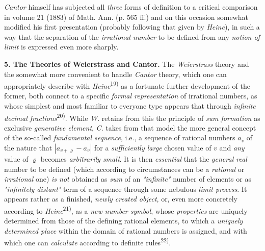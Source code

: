 \thispagestyle{fancy}

\vspace{0.5cm}

\textit{Cantor} himself has subjected all \textit{three} forms of definition to a critical comparison in volume 21 (1883) of Math. Ann. (p. 565 ff.) and on this occasion somewhat modified his first presentation (probably following that given by \textit{Heine}), in such a way that the separation of the \textit{irrational number} to be defined from any \textit{notion of limit} is expressed even more sharply.

\vspace{0.3cm}

\textbf{5. The Theories of Weierstrass and Cantor.} The \textit{Weierstrass} theory and the somewhat more convenient to handle \textit{Cantor} theory, which one can appropriately describe with \textit{Heine}\textsuperscript{19)} as a fortunate further development of the former, both connect to a specific \textit{formal representation} of irrational numbers, as whose simplest and most familiar to everyone type appears that through \textit{infinite decimal fractions}\textsuperscript{20)}. While \textit{W}. retains from this the principle of \textit{sum formation} as exclusive \textit{generative element}, \textit{C}. takes from that model the more general concept of the so-called \textit{fundamental sequence}, i.e., a sequence of rational numbers $a_v$ of the nature that $|a_{v+\varrho}-a_v|$ for a \textit{sufficiently large} chosen value of $v$ and \textit{any} value of $\varrho$ becomes \textit{arbitrarily small}. It is then \textit{essential} that the \textit{general real} number to be defined (which according to circumstances can be a \textit{rational} or \textit{irrational} one) \textit{is not} obtained as \textit{sum} of an \textit{"infinite"} number of elements or as \textit{"infinitely distant"} term of a sequence through some nebulous \textit{limit process}. It appears rather as a finished, \textit{newly created object}, or, even more concretely according to \textit{Heine}\textsuperscript{21)}, as a \textit{new number symbol}, whose \textit{properties} are uniquely determined from those of the defining rational elements, to which a \textit{uniquely determined place} within the domain of rational numbers is assigned, and with which one can \textit{calculate} according to definite rules\textsuperscript{22)}.

